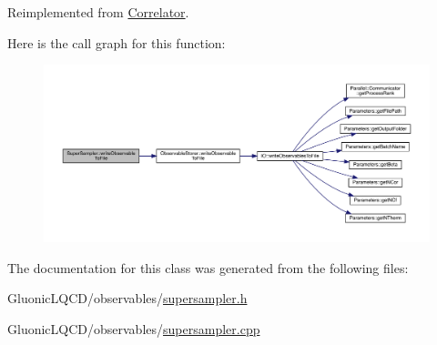 Reimplemented from \mbox{\hyperlink{class_correlator_a9e8d80e30e4fbe3b7fe57521538cb5ff}{Correlator}}.

Here is the call graph for this function\+:\nopagebreak
\begin{figure}[H]
\begin{center}
\leavevmode
\includegraphics[width=350pt]{class_super_sampler_a05b42b82879233dc329d280a61bfd7f0_cgraph}
\end{center}
\end{figure}


The documentation for this class was generated from the following files\+:\begin{DoxyCompactItemize}
\item 
Gluonic\+L\+Q\+C\+D/observables/\mbox{\hyperlink{supersampler_8h}{supersampler.\+h}}\item 
Gluonic\+L\+Q\+C\+D/observables/\mbox{\hyperlink{supersampler_8cpp}{supersampler.\+cpp}}\end{DoxyCompactItemize}
